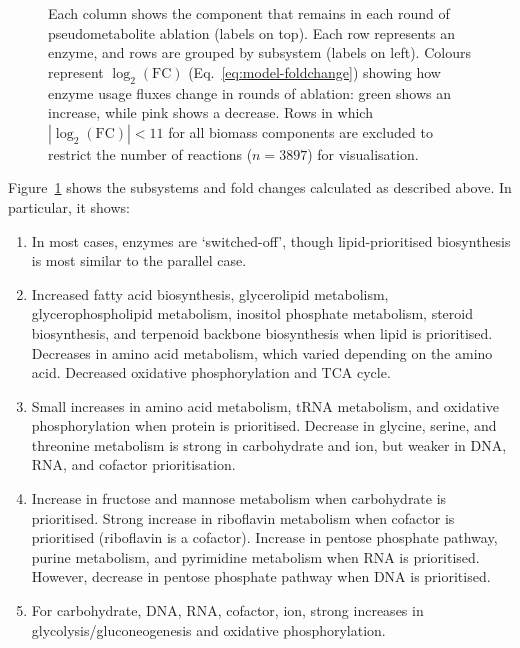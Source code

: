 \begin{figure}
{    %
    Each column shows the component that remains in each round of pseudometabolite ablation (labels on top).
    Each row represents an enzyme, and rows are grouped by subsystem (labels on left).
    Colours represent $\log_{2}(\mathrm{FC})$ (Eq.\ \ref{eq:model-foldchange}) showing how enzyme usage fluxes change in rounds of ablation: green shows an increase, while pink shows a decrease.
    Rows in which $|\log_{2}(\mathrm{FC})| < 11$ for all biomass components are excluded to restrict the number of reactions ($n = 3897$) for visualisation.
  }
  \label{fig:model-ablate-enz-use}
\end{figure}

Figure~\ref{fig:model-ablate-enz-use} shows the subsystems and fold changes calculated as described above.
In particular, it shows:

\begin{enumerate}
  \item In most cases, enzymes are `switched-off', though lipid-prioritised biosynthesis is most similar to the parallel case.
  \item Increased fatty acid biosynthesis, glycerolipid metabolism, glycerophospholipid metabolism, inositol phosphate metabolism, steroid biosynthesis, and terpenoid backbone biosynthesis when lipid is prioritised.
        Decreases in amino acid metabolism, which varied depending on the amino acid.
        Decreased oxidative phosphorylation and TCA cycle.
  \item Small increases in amino acid metabolism, tRNA metabolism, and oxidative phosphorylation when protein is prioritised.
        Decrease in glycine, serine, and threonine metabolism is strong in carbohydrate and ion, but weaker in DNA, RNA, and cofactor prioritisation.
  \item Increase in fructose and mannose metabolism when carbohydrate is prioritised.
        Strong increase in riboflavin metabolism when cofactor is prioritised (riboflavin is a cofactor).
        Increase in pentose phosphate pathway, purine metabolism, and pyrimidine metabolism when RNA is prioritised.
        However, decrease in pentose phosphate pathway when DNA is prioritised.
  \item For carbohydrate, DNA, RNA, cofactor, ion, strong increases in glycolysis/glu\-co\-neo\-ge\-ne\-sis and oxidative phosphorylation.
\end{enumerate}

